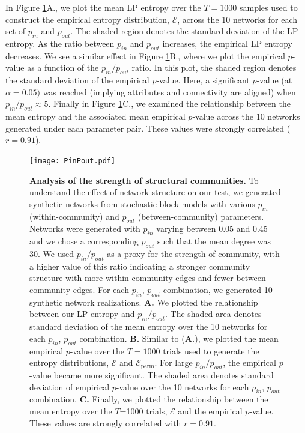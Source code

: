 \indent In Figure \ref{Pin}A., we plot the mean LP entropy over the $T=1000$ samples used to construct the empirical entropy distribution, $\mathcal{E}$, across the 10 networks for each set of $p_{in}$ and $p_{out}$. The shaded region denotes the standard deviation of the LP entropy. As the ratio between $p_{in}$ and $p_{out}$ increases, the empirical LP entropy decreases. We see a similar effect in Figure \ref{Pin}B., where we plot the empirical $p$-value as a function of the $p_{in}/p_{out}$ ratio. In this plot, the shaded region denotes the standard deviation of the empirical $p$-value. Here, a significant $p$-value (at $\alpha=0.05)$ was reached (implying attributes and connectivity are aligned) when $p_{in}/p_{out} \approx 5$. Finally in Figure \ref{Pin}C., we examined the relationship between the mean entropy and the associated mean empirical $p$-value across the 10 networks generated under each parameter pair. These values were strongly correlated ($r=0.91$).  

\begin{figure}
\centering
\begin{center}
\texttt{[image: PinPout.pdf]}
\caption{{\bf Analysis of the strength of structural communities.} To understand the effect of network structure on our test, we generated synthetic networks from stochastic block models with various $p_{in}$ (within-community) and $p_{out}$ (between-community) parameters. Networks were generated with $p_{in}$ varying between 0.05 and 0.45 and we chose a corresponding $p_{out}$ such that the mean degree was 30. We used $p_{in}/p_{out}$ as a proxy for the strength of community, with a higher value of this ratio indicating a stronger community structure with more within-community edges and fewer between community edges. For each $p_{in}$, $p_{out}$ combination, we generated 10 synthetic network realizations. {\bf A.} We plotted the relationship between our LP entropy and $p_{in}/p_{out}$. The shaded area denotes standard deviation of the mean entropy over the 10 networks for each $p_{in}$, $p_{out}$ combination. {\bf B.} Similar to ({\bf A.}), we plotted the mean empirical $p$-value over the $T=1000$ trials used to generate the entropy distributions, $\mathcal{E}$ and $\mathcal{E}_{\text{perm}}$. For large $p_{in}/p_{out}$, the empirical $p$-value became more significant. The shaded area denotes standard deviation of empirical $p$-value over the 10 networks for each $p_{in}$, $p_{out}$ combination. {\bf C.} Finally, we plotted the relationship between the mean entropy over the $T$=1000 trials, $\mathcal{E}$ and the empirical $p$-value. These values are strongly correlated with $r=0.91$. }
\label{Pin}
\end{center}
\end{figure}

